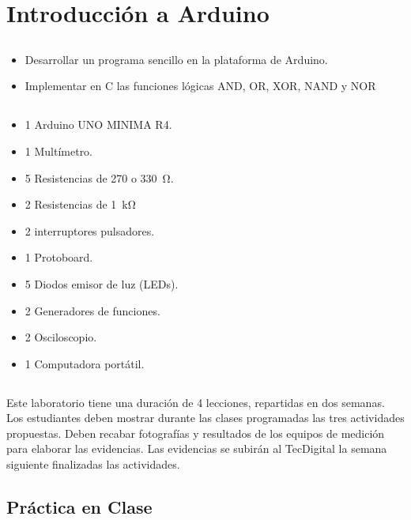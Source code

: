 \chapter{Introducción a Arduino}
\section{\obj}
\capacidad
\begin{itemize}
    \item Desarrollar un programa sencillo en la plataforma de Arduino.
    \item Implementar en C las funciones lógicas AND, OR, XOR, NAND y NOR
\end{itemize}

\section{\mat}
\begin{itemize}
\item 1 Arduino UNO MINIMA R4.
\item 1 Multímetro.
\item 5 Resistencias de 270 o \SI{330}{\ohm}.
\item 2 Resistencias de \SI{1}{\kilo\ohm}
\item 2 interruptores pulsadores.
\item 1 Protoboard.
\item 5 Diodos emisor de luz (LEDs).
\item 2 Generadores de funciones.
\item 2 Osciloscopio.
\item 1 Computadora portátil.
\end{itemize}

\section{\pro}

Este laboratorio tiene una duración de 4 lecciones, repartidas en dos semanas. Los estudiantes deben mostrar durante las clases programadas las tres actividades propuestas. Deben recabar fotografías y resultados de los equipos de medición para elaborar las evidencias. Las evidencias se subirán al TecDigital la semana siguiente finalizadas las actividades.

\section{Práctica en Clase}

